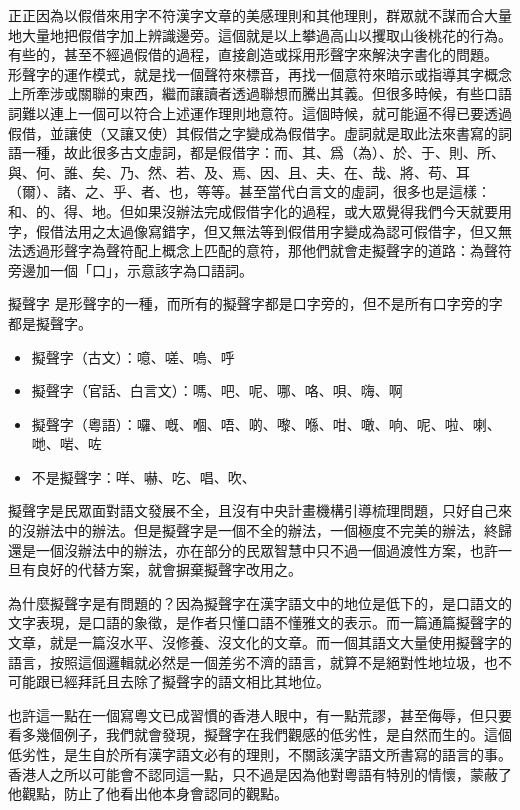 \documentclass[a5paper, 12pt, openany]{book} %
\begin{document}
正正因為以假借來用字不符漢字文章的美感理則和其他理則，群眾就不謀而合大量地大量地把假借字加上辨識邊旁。這個就是以上攀過高山以攫取山後桃花的行為。有些的，甚至不經過假借的過程，直接創造或採用形聲字來解決字書化的問題。 形聲字的運作模式，就是找一個聲符來標音，再找一個意符來暗示或指導其字概念上所牽涉或關聯的東西，繼而讓讀者透過聯想而騰出其義。但很多時候，有些口語詞難以連上一個可以符合上述運作理則地意符。這個時候，就可能逼不得已要透過假借，並讓使（又讓又使）其假借之字變成為假借字。虛詞就是取此法來書寫的詞語一種，故此很多古文虛詞，都是假借字：而、其、爲（為）、於、于、則、所、與、何、誰、矣、乃、然、若、及、焉、因、且、夫、在、哉、將、苟、耳（爾）、諸、之、乎、者、也，等等。甚至當代白言文的虛詞，很多也是這樣：和、的、得、地。但如果沒辦法完成假借字化的過程，或大眾覺得我們今天就要用字，假借法用之太過像寫錯字，但又無法等到假借用字變成為認可假借字，但又無法透過形聲字為聲符配上概念上匹配的意符，那他們就會走擬聲字的道路：為聲符旁邊加一個「口」，示意該字為口語詞。

擬聲字 是形聲字的一種，而所有的擬聲字都是口字旁的，但不是所有口字旁的字都是擬聲字。

\begin{itemize}
\item 擬聲字（古文）：噫、嗟、嗚、呼
\item 擬聲字（官話、白言文）：嗎、吧、呢、哪、咯、唄、嗨、啊
\item 擬聲字（粵語）：囉、嘅、嗰、唔、啲、嚟、喺、咁、噉、响、呢、啦、喇、哋、啱、咗
\item 不是擬聲字：咩、嚇、吃、唱、吹、
  
\end{itemize}

擬聲字是民眾面對語文發展不全，且沒有中央計畫機構引導梳理問題，只好自己來的沒辦法中的辦法。但是擬聲字是一個不全的辦法，一個極度不完美的辦法，終歸還是一個沒辦法中的辦法，亦在部分的民眾智慧中只不過一個過渡性方案，也許一旦有良好的代替方案，就會摒棄擬聲字改用之。

為什麼擬聲字是有問題的？因為擬聲字在漢字語文中的地位是低下的，是口語文的文字表現，是口語的象徵，是作者只懂口語不懂雅文的表示。而一篇通篇擬聲字的文章，就是一篇沒水平、沒修養、沒文化的文章。而一個其語文大量使用擬聲字的語言，按照這個邏輯就必然是一個差劣不濟的語言，就算不是絕對性地垃圾，也不可能跟已經拜託且去除了擬聲字的語文相比其地位。

也許這一點在一個寫粵文已成習慣的香港人眼中，有一點荒謬，甚至侮辱，但只要看多幾個例子，我們就會發現，擬聲字在我們觀感的低劣性，是自然而生的。這個低劣性，是生自於所有漢字語文必有的理則，不關該漢字語文所書寫的語言的事。香港人之所以可能會不認同這一點，只不過是因為他對粵語有特別的情懷，蒙蔽了他觀點，防止了他看出他本身會認同的觀點。
\end{document}
